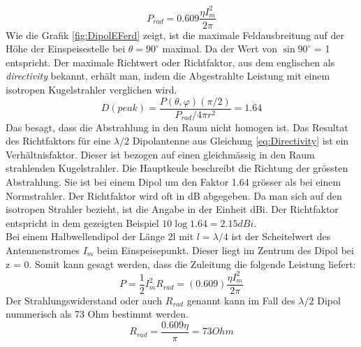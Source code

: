 \begin{equation}
P_{rad}=0.609 \frac{\eta I_{m}^{2}}{2\pi}
\end{equation}
Wie die  Grafik \ref{fig:DipolEFerd} zeigt, ist die maximale Feldausbreitung auf der Höhe der Einspeisestelle bei $\theta = 90 ^\circ $ maximal.  Da der Wert von  $\sin90^\circ  $ = 1 entspricht.
Der maximale Richtwert oder Richtfaktor,  aus dem englischen als \textit{directivity} bekannt, erhält man, indem die Abgestrahlte Leistung mit einem isotropen Kugelstrahler verglichen wird\cite{elliott1981antenna}.
\begin{equation}
D(peak)=\frac{P(\theta,\varphi)(\pi/2)}{P_{rad}/ 4 \pi r^{2}} =1.64
\label{eq:Directivity}
\end{equation}
Das besagt, dass die Abstrahlung in den Raum nicht homogen ist. Das Resultat des Richtfaktors für eine $\lambda /2$ Dipolantenne aus Gleichung \ref{eq:Directivity} ist ein Verhältnisfaktor. Dieser ist bezogen auf einen gleichmässig in den Raum strahlenden Kugelstrahler. Die Hauptkeule beschreibt die Richtung der grössten Abstrahlung. Sie ist bei einem Dipol um den Faktor 1.64 grösser als bei einem Normstrahler. Der Richtfaktor wird oft in dB abgegeben. Da man sich auf den isotropen Strahler bezieht, ist die Angabe in der Einheit dBi. Der Richtfaktor entspricht in dem gezeigten Beispiel $10\log{1.64}=2.15dBi$.\\
Bei einem Halbwellendipol der Länge 2l mit $l=\lambda/4 $ ist der Scheitelwert des Antennenstromes $I_{m}$ beim Einspeisepunkt. Dieser liegt im Zentrum des Dipol bei z = 0. Somit kann gesagt werden, dass die Zuleitung  die folgende Leistung  liefert:
\begin{equation}
P=\frac{1}{2} I_{m}^{2}R_{rad}=(0.609)\frac{\eta I_{m}^{2}}{2\pi}
\end{equation}
Der Strahlungswiderstand oder auch $R_{rad}$ genannt kann im Fall des $\lambda /2$ Dipol nummerisch als 73 Ohm bestimmt werden.
\begin{equation}\label{RradDipol}
R_{rad}=\frac{0.609 \eta}{\pi}= 73 Ohm
\end{equation}
